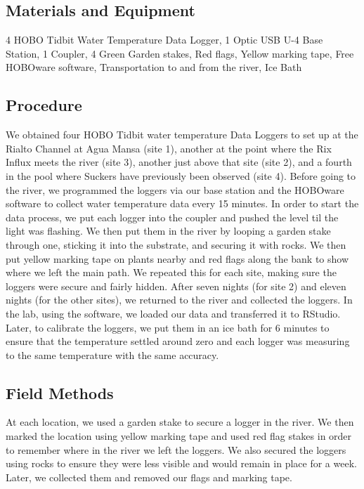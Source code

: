 \documentclass{article}
\begin{document}
\subsection{Materials and Equipment}

4 HOBO Tidbit Water Temperature Data Logger,
1 Optic USB U-4 Base Station,
1 Coupler,
4 Green Garden stakes,
Red flags,
Yellow marking tape,
Free HOBOware software,
Transportation to and from the river,
Ice Bath

\subsection{Procedure}

We obtained four HOBO Tidbit water temperature Data Loggers to set up at the Rialto Channel at Agua Mansa (site 1), another at the point where the Rix Influx meets the river (site 3), another just above that site (site 2), and a fourth in the pool where Suckers have previously been observed (site 4). Before going to the river, we programmed the loggers via our base station and the HOBOware software to collect water temperature data every 15 minutes. In order to start the data process, we put each logger into the coupler and pushed the level til the light was flashing. We then put them in the river by looping a garden stake through one, sticking it into the substrate, and securing it with rocks. We then put yellow marking tape on plants nearby and red flags along the bank to show where we left the main path. We repeated this for each site, making sure the loggers were secure and fairly hidden. After seven nights (for site 2) and eleven nights (for the other sites), we returned to the river and collected the loggers. In the lab, using the software, we loaded our data and transferred it to RStudio. Later, to calibrate the loggers, we put them in an ice bath for 6 minutes to ensure that the temperature settled around zero and each logger was measuring to the same temperature with the same accuracy.

\subsection{Field Methods} 

At each location, we used a garden stake to secure a logger in the river. We then marked the location using yellow marking tape and used red flag stakes in order to remember where in the river we left the loggers. We also secured the loggers using rocks to ensure they were less visible and would remain in place for a week. Later, we collected them and removed our flags and marking tape. 
\end{document}
